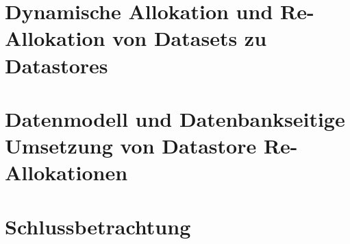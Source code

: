 
\chapter{Dynamische Allokation und Re-Allokation von Datasets zu Datastores}



\chapter{Datenmodell und Datenbankseitige Umsetzung von Datastore Re-Allokationen}


\chapter{Schlussbetrachtung}